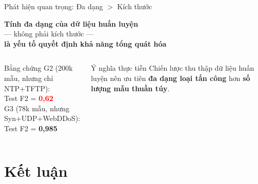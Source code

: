 \documentclass[aspectratio=169,12pt]{beamer}
\newcommand{\good}[1]{\textcolor{mygreen}{\textbf{#1}}}
\newcommand{\bad}[1]{\textcolor{red}{\textbf{#1}}}
\begin{document}
\begin{frame}{Phát hiện quan trọng: Đa dạng $>$ Kích thước}
  \begin{center}
    \Large
    \textbf{Tính đa dạng của dữ liệu huấn luyện}\\
    --- không phải kích thước ---\\
    \textbf{là yếu tố quyết định khả năng tổng quát hóa}
  \end{center}
  \vspace{0.5em}
  \begin{columns}[T]
      \begin{alertblock}{Bằng chứng}
        G2 (200k mẫu, nhưng chỉ NTP+TFTP):\\
        Test F2 = \bad{0,62}\\[0.3em]
        G3 (78k mẫu, nhưng Syn+UDP+WebDDoS):\\
        Test F2 = \good{0,985}
      \end{alertblock}
      \begin{block}{Ý nghĩa thực tiễn}
        Chiến lược thu thập dữ liệu huấn luyện nên ưu tiên \textbf{đa dạng loại tấn công} hơn \textbf{số lượng mẫu thuần túy}.
      \end{block}
  \end{columns}
\end{frame}

\section{Kết luận}
\end{document}
